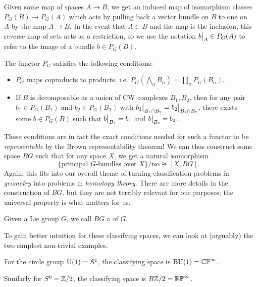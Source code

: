 \documentclass{article}
\begin{document}
Given some map of spaces $A \to B$, we get an induced map of isomorphism classes $P_G(B) \to P_G(A)$ which acts by pulling back a vector bundle on $B$ to one on $A$ by the map $A\to B$. In the event that $A\subset B$ and the map is the inclusion, this reverse map of sets acts as a restriction, so we use the notation $\restr{b}{A}\in P_G(A)$ to refer to the image of a bundle $b\in P_G(B)$.

\begin{lemma}
  The functor $P_G$ satisfies the following conditions:
  \begin{itemize}
    \item $P_G$ maps coproducts to products, i.e. $P_G(\bigwedge_\alpha B_\alpha) = \prod_\alpha P_G(B_\alpha)$.
    \item If $B$ is decomposable as a union of CW complexes $B_1, B_2$, then for any pair $b_1\in P_G(B_1)$ and $b_2\in P_G(B_2)$ with $\restr{b_1}{B_1\cap B_2} = \restr{b_2}{B_1\cap B_2}$, there exists some $b\in P_G(B)$ such that $\restr{b}{B_1} = b_1$ and $\restr{b}{B_2}=b_2$.
  \end{itemize}
\end{lemma}

These conditions are in fact the exact conditions needed for such a functor to be \emph{representable} by the Brown representability theorem! We can thus construct some space $BG$ such that for any space $X$, we get a natural isomorphism
\[
  \{\textrm{principal $G$-bundles over }X\}/\textrm{iso} \cong [X, BG].
\]
Again, this fits into our overall theme of turning classification problems in \emph{geometry} into problems in \emph{homotopy theory}. There are more details in the construction of $BG$, but they are not terribly relevant for our purposes; the universal property is what matters for us.

\begin{definition}
  Given a Lie group $G$, we call $BG$ a  of $G$.
\end{definition}

To gain better intuition for these classifying spaces, we can look at (arguably) the two simplest non-trivial examples.

\begin{example}
  For the circle group $\mathrm{U}(1)=S^1$, the classifying space is $\mathrm{BU}(1)=\mathbb{CP}^\infty$.
\end{example}

\begin{example}
  Similarly for $S^0=\mathbb{Z}/2$, the classifying space is $B\mathbb{Z}/2=\mathbb{RP}^\infty$.
\end{example}
\end{document}
